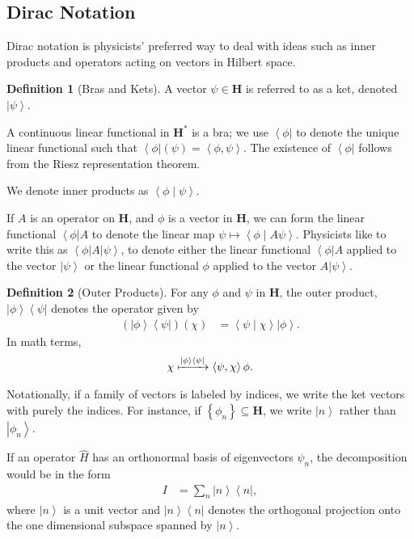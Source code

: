 \documentclass[12pt]{extarticle}
\newcommand{\bra}[1]{\left\langle#1\right\vert}
\newcommand{\ket}[1]{\left\vert#1\right\rangle}
\newcommand{\braket}[2]{\left\langle#1\mid#2\right\rangle}
\newcommand{\set}[1]{\left\{#1\right\}}
\newcommand{\iprod}[2]{\left\langle #1,#2\right\rangle}
\theoremstyle{plain}
\theoremstyle{definition}
\newtheorem*{definition}{Definition}
\theoremstyle{remark}
\renewcommand{\newline}{\hfill\break}
\begin{document}
  \subsection{Dirac Notation}%
  Dirac notation is physicists' preferred way to deal with ideas such as inner products and operators acting on vectors in Hilbert space.
  \begin{definition}[Bras and Kets]
    A vector $\psi\in \mathbf{H}$ is referred to as a ket, denoted $\ket{\psi}$.\newline

    A continuous linear functional in $\mathbf{H}^{\ast}$ is a bra; we use $\bra{\phi}$ to denote the unique linear functional such that $\bra{\phi}(\psi) = \iprod{\phi}{\psi}$. The existence of $\bra{\phi}$ follows from the Riesz representation theorem.\newline

    We denote inner products as $\braket{\phi}{\psi}$.
  \end{definition}
  If $A$ is an operator on $\mathbf{H}$, and $\phi$ is a vector in $\mathbf{H}$, we can form the linear functional $\bra{\phi}A$ to denote the linear map $\psi \mapsto \braket{\phi}{A\psi}$. Physicists like to write this as $\bra{\phi} A \ket{\psi}$, to denote either the linear functional $\bra{\phi}A$ applied to the vector $\ket{\psi}$ or the linear functional $\phi$ applied to the vector $A\ket{\psi}$.
  \begin{definition}[Outer Products]
    For any $\phi$ and $\psi$ in $\mathbf{H}$, the outer product, $\ket{\phi}\bra{\psi}$ denotes the operator given by
    \begin{align*}
      \left(\ket{\phi}\bra{\psi}\right)(\chi) &= \braket{\psi}{\chi} \ket{\phi}.
    \end{align*}
    In math terms,
    \begin{align*}
      \chi \xmapsto{\ket{\phi}\bra{\psi}}\iprod{\psi}{\chi}\phi.
    \end{align*}
  \end{definition}
  Notationally, if a family of vectors is labeled by indices, we write the ket vectors with purely the indices. For instance, if $\set{\phi_{n}}\subseteq \mathbf{H}$, we write $\ket{n}$ rather than $\ket{\phi_n}$.\newline

  If an operator $\hat{H}$ has an orthonormal basis of eigenvectors $\psi_n$, the decomposition would be in the form
  \begin{align*}
    I &= \sum_{n}\ket{n}\bra{n},
  \end{align*}
  where $\ket{n}$ is a unit vector and $\ket{n}\bra{n}$ denotes the orthogonal projection onto the one dimensional subspace spanned by $\ket{n}$.\newline
\end{document}
